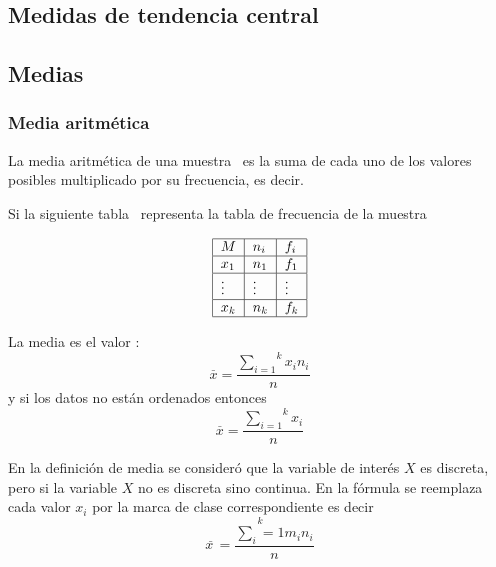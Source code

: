 



\subsection{Medidas de tendencia central}

\subsection{Medias}

\subsubsection{Media aritm\'{e}tica}

La media aritm\'{e}tica de una muestra \ es la suma de cada uno de los valores
posibles multiplicado por su frecuencia, es decir.

Si la siguiente tabla \ representa la tabla de frecuencia de la muestra%

\[%
\begin{tabular}
[c]{|l|l|l|}\hline
$M$ & $n_{i}$ & $f_{i}$\\\hline
$x_{1}$ & $n_{1}$ & $f_{1}$\\\hline
$\vdots$ & $\vdots$ & $\vdots$\\\hline
$x_{k}$ & $n_{k}$ & $f_{k}$\\\hline
\end{tabular}
\]

La media es el valor :
\begin{equation}
\overset{\_}{x}=\frac{\overset{k}{\sum_{i=1}}x_{i}n_{i}}{n} \label{2-1}%
\end{equation}
y si los datos no est\'{a}n ordenados entonces $\ $%
\begin{equation}
\overset{\_}{x}=\frac{\overset{k}{\sum_{i=1}}x_{i}}{n} \label{2-2}%
\end{equation}%

\begin{remark}
En la definici\'{o}n de media se consider\'{o} que la variable de inter\'{e}s
$X$ es discreta, pero si la variable $X$ no es discreta sino continua. En la
f\'{o}rmula se reemplaza cada valor $x_{i}$ por la marca de clase
correspondiente es decir
\begin{equation}
\overset{\_}{x\,}=\frac{\overset{k}{\sum_i=1}m_in_i}{n} \label{2-3}
\end{equation}
\end{remark}

